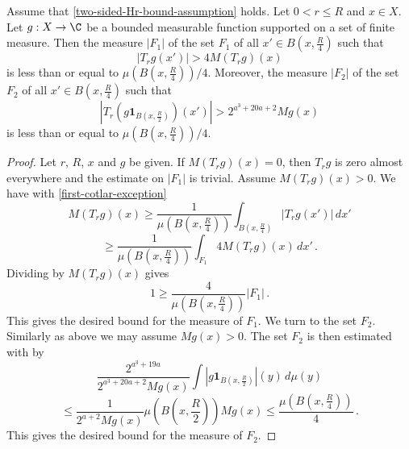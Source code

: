 \begin{lemma}
\label{Cotlar-sets}
\leanok
{}
Assume that \eqref{two-sided-Hr-bound-assumption} holds. Let $0<r\le R$ and  $x\in X$. Let $g:X\to\C$ be a bounded measurable function supported on a set of finite measure.
Then the measure $|F_1|$ of the set $F_1$ of all $x'\in B(x,\frac {R} 4)$ such that
\begin{equation}
\label{first-cotlar-exception}
    |T_rg(x')|> 4 M(T_rg)(x)
\end{equation}
is less than or equal to $\mu(B(x,\frac{R}{4}))/4$.
Moreover,  the measure $|F_2|$ of the set $F_2$ of all $x'\in
B(x,\frac {R} 4)$ such that
\begin{equation}
\label{second-cotlar-exception}
    |T_r(g\mathbf{1}_{B(x,\frac {R} 2)})(x')| > 2^{a^3 + 20a + 2} Mg(x)
\end{equation}
is less than or equal to  $\mu(B(x,\frac{R}{4}))/4$.
\end{lemma}

\begin{proof}
Let $r$, $R$, $x$ and $g$ be given.
If $M(T_rg)(x)=0$, then $T_rg$ is zero almost everywhere and the estimate on $|F_1|$ is trivial.
Assume $M(T_rg)(x)>0$.
We have with \eqref{first-cotlar-exception}
\begin{equation}
    M(T_rg)(x)\ge
    \frac 1{\mu(B(x,\frac{R}{4}))}\int_{B(x,\frac{R}{4})}|T_rg(x')|\, dx'
\end{equation}
\begin{equation}
    \ge
    \frac 1{\mu(B(x,\frac{R}{4}))}\int_{F_1} 4 M(T_rg)(x)\, dx' \,.
\end{equation}
Dividing by $M(T_rg)(x)$ gives
\begin{equation}
    1\ge \frac{4}{\mu(B(x,\frac{R}{4}))} |F_1|\, .
\end{equation}
This gives the desired bound for the measure of $F_1$.
We turn to the set $F_2$. Similarly as above we may assume $Mg(x)>0$.
The set $F_2$ is then estimated with  by
\begin{equation}
   \frac {2^{a^3+19a}}{2^{a^3 + 20a + 2}Mg(x)}\int |g\mathbf{1}_{B(x,\frac {R}2)}|(y)\, d\mu(y)
\end{equation}
\begin{equation}
   \le \frac {1}{2^{a+2} Mg(x)}\mu(B(x,\frac {R}{2})) Mg(x) \le \frac{\mu(B(x,\frac {R}{4}))}{4} \,.
\end{equation}
This gives the desired bound for the measure of $F_2$.
\end{proof}

